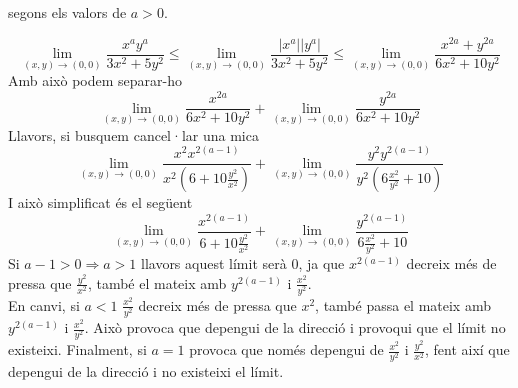 \documentclass[a4paper, 12pt]{article}
\begin{document}
\begin{exercici}
\begin{enumerate}[label=\alph*)]
            segons els valors de $a > 0$.\\
            \begin{solucio}
                \begin{displaymath}
                    \lim\limits_{\left(x,y\right) \to \left(0,0\right)}\frac{x^ay^a}{3x^2+5y^2} \leq \lim\limits_{\left(x,y\right) \to \left(0,0\right)}\frac{\left\lvert x^a\right\rvert \left\lvert y^a\right\rvert }{3x^2+5y^2} \leq \lim\limits_{\left(x,y\right) \to \left(0,0\right)}\frac{x^{2a}+y^{2a}}{6x^2+10y^2}
                \end{displaymath}
                Amb això podem separar-ho
                \begin{displaymath}
                    \lim\limits_{\left(x,y\right) \to \left(0,0\right)}\frac{x^{2a}}{6x^2+10y^2}+\lim\limits_{\left(x,y\right) \to \left(0,0\right)}\frac{y^{2a}}{6x^2+10y^2}
                \end{displaymath}
                Llavors, si busquem cancel·lar una mica
                \begin{displaymath}
                    \lim\limits_{\left(x,y\right) \to \left(0,0\right)} \frac{x^2x^{2\left(a-1\right)}}{x^2\left(6+10\frac{y^2}{x^2}\right)} + \lim\limits_{\left(x,y\right) \to \left(0,0\right)} \frac{y^2y^{2\left(a-1\right)}}{y^2\left(6\frac{x^2}{y^2}+10\right)}
                \end{displaymath}
                I això simplificat és el següent
                \begin{displaymath}
                    \lim\limits_{\left(x,y\right) \to \left(0,0\right)} \frac{x^{2\left(a-1\right)}}{6+10\frac{y^2}{x^2}} + \lim\limits_{\left(x,y\right) \to \left(0,0\right)} \frac{y^{2\left(a-1\right)}}{6\frac{x^2}{y^2}+10}
                \end{displaymath}
                Si $a-1 > 0 \Rightarrow a > 1$ llavors aquest límit serà $0$, ja que $x^{2(a-1)}$
                decreix més de pressa que $\frac{y^2}{x^2}$, també el mateix amb $y^{2(a-1)}$ i $\frac{x^2}{y^2}$.\\
                En canvi, si $a<1$ $\frac{x^2}{y^2}$ decreix més de pressa que $x^2$, també passa el
                mateix amb $y^{2(a-1)}$ i $\frac{x^2}{y^2}$. Això provoca que depengui de la
                direcció i provoqui que el límit no existeixi. Finalment, si $a = 1$ provoca que
                només depengui de $\frac{x^2}{y^2}$ i $\frac{y^2}{x^2}$, fent així que depengui de
                la direcció i no existeixi el límit.
            \end{solucio}
        \end{enumerate}
    \end{exercici}
\end{document}
